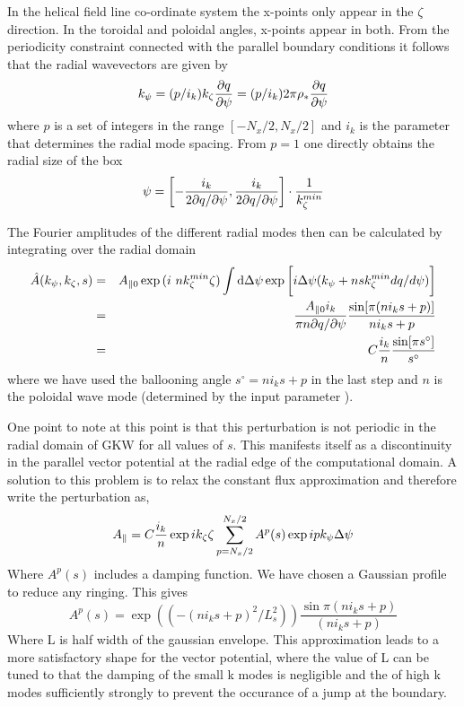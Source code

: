 In the helical field line co-ordinate system the x-points only appear in the $\zeta$ direction.  In the toroidal and poloidal angles, x-points appear in both.  
From the periodicity constraint connected with the parallel boundary conditions it follows that the radial wavevectors are given by
\begin{equation} 
 k_\psi = (p/i_k) k_\zeta {\partial q \over \partial \psi} = (p/i_k) 2 \pi \rho_* {\partial q \over \partial \psi} 
\end{equation} 
where $p$ is a set of integers in the range $[-N_x/2, N_x/2]$ and $i_k$ is the parameter that determines the radial mode spacing.  
From $p = 1$ one directly obtains the radial size of the box 
\begin{equation} 
\psi = \biggl [ - { i_k \over 2 \partial q / \partial \psi} , {i_k \over 2 \partial q / \partial \psi} \biggr ] \cdot {1 \over k_\zeta^{min}} 
\end{equation}

The Fourier amplitudes of the different radial modes then can be calculated by integrating over 
the radial domain 
\begin{align}
\hat{A}(k_\psi, k_\zeta, s) &=& A_{\parallel0} \exp{(i\ n k_\zeta^{min}\zeta)}\int {\rm d} \Delta\psi \exp{\biggl [i\Delta\psi( k_\psi + n s k_\zeta^{min} dq/d\psi)   \biggr ]} \nonumber\\
&=& {A_{\parallel0} i_k \over \pi n \partial q / \partial \psi} {\sin [ \pi (n i_k s + p) ] \over n i_k s + p}  \nonumber\\
&=& C{i_k \over n} {\sin [ \pi s^\circ ] \over s^\circ} 
\end{align}
where we have used the ballooning angle $s^\circ = n i_k s + p$ in the last step and $n$ is the poloidal wave mode (determined by the input parameter ).

One point to note at this point is that this perturbation is not periodic in the radial domain of GKW for all values of $s$.  This manifests itself as a discontinuity in the parallel vector potential at the radial edge of the computational domain.  A solution to this problem is to relax the constant flux approximation and therefore write the perturbation as,
\begin{equation} 
A_\parallel = C{i_k \over n} \exp{i k_{\zeta}\zeta}\sum_{p=N_x/2}^{N_x/2} A^{p}(s)\exp{i pk_{\psi}\Delta\psi}
\end{equation}  
Where $A^{p}(s)$ includes a damping function.  We have chosen a Gaussian profile to reduce any ringing.  This gives
\begin{equation}
A^{p}(s) = \exp{\left((-(n i_k s + p)^{2}/L_s^{2})\right)}\frac{\sin{\pi(n i_k s + p)}}{(n i_k s + p)}
\end{equation}
Where L is half width of the gaussian envelope.  This approximation leads to a more satisfactory shape for the vector potential, where the value of L can be tuned to that the damping of the small k modes is negligible and the of high k modes sufficiently strongly to prevent the occurance of a jump at the boundary.

